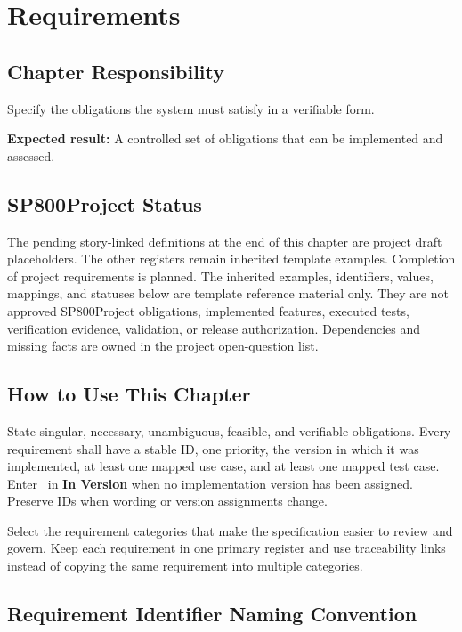 \chapter{Requirements}

\section{Chapter Responsibility}
\label{Section:RequirementsResponsibility}
Specify the obligations the system must satisfy in a verifiable form.

\noindent\textbf{Expected result:} A controlled set of obligations that can be implemented and assessed.

\section{SP800Project Status}
\label{Section:SP800StatusRequirements}
The pending story-linked definitions at the end of this chapter are project
draft placeholders. The other registers remain inherited template examples.
Completion of project requirements is planned. The inherited examples,
identifiers, values, mappings, and statuses below are template reference
material only. They are not approved SP800Project obligations, implemented features,
executed tests, verification evidence, validation, or release authorization.
Dependencies and missing facts are owned in
\hyperref[Section:SP800OpenQuestions]{the project open-question list}.

\section{How to Use This Chapter}
State singular, necessary, unambiguous, feasible, and verifiable obligations.
Every requirement shall have a stable ID, one priority, the version in which it
was implemented, at least one mapped use case, and at least one mapped test case.
Enter \NoVersion\ in \textbf{In Version} when no implementation version has
been assigned. Preserve IDs when wording or version assignments change.

Select the requirement categories that make the specification easier to review
and govern. Keep each requirement in one primary register and use traceability
links instead of copying the same requirement into multiple categories.

\section{Requirement Identifier Naming Convention}
\label{Section:RequirementIdentifierConvention}

